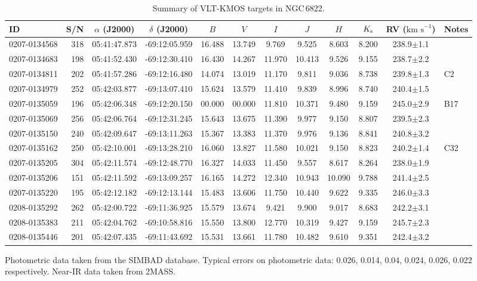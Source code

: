 \documentclass[useAMS,usenatbib]{mn2e}
\def\kms{$\mbox{km s}^{-1}$}
\begin{document}
\begin{table}
\caption{
        Summary of VLT-KMOS targets in NGC\,6822.\label{tb:obs-params}
        }
\scriptsize
\begin{center}
\begin{tabular}{lrcccccccccl}
 \hline
 \hline
ID & S/N & $\alpha$ (J2000) & $\delta$ (J2000) & $B$ & $V$ & $I$ & $J$ & $H$ & $K_{\rm s}$ & RV (\kms) & Notes \\
 \hline
0207-0134568 & 318 & 05:41:47.873 & -69:12:05.959 & 16.488 & 13.749 &  9.769 &  9.525 &  8.603 & 8.200 & 238.9$\pm$1.1\\
0207-0134683 & 198 & 05:41:52.430 & -69:12:30.410 & 16.430 & 14.267 & 11.970 & 10.413 &  9.526 & 9.155 & 238.7$\pm$2.2\\
0207-0134811 & 202 & 05:41:57.286 & -69:12:16.480 & 14.074 & 13.019 & 11.170 &  9.811 &  9.036 & 8.738 & 239.8$\pm$1.3 & C2\\
0207-0134979 & 252 & 05:42:03.877 & -69:13:07.410 & 15.624 & 13.579 & 11.410 &  9.839 &  8.996 & 8.740 & 240.4$\pm$1.5\\
0207-0135059 & 196 & 05:42:06.348 & -69:12:20.150 & 00.000 & 00.000 & 11.810 & 10.371 &  9.480 & 9.159 & 245.0$\pm$2.9 & B17\\
0207-0135069 & 256 & 05:42:06.764 & -69:12:31.245 & 15.643 & 13.675 & 11.390 &  9.977 &  9.150 & 8.807 & 239.5$\pm$2.3\\
0207-0135150 & 240 & 05:42:09.647 & -69:13:11.263 & 15.367 & 13.383 & 11.370 &  9.976 &  9.136 & 8.841 & 240.8$\pm$3.2\\
0207-0135162 & 250 & 05:42:10.001 & -69:13:28.210 & 16.060 & 13.827 & 11.580 & 10.021 &  9.150 & 8.823 & 240.2$\pm$1.4 & C32\\
0207-0135205 & 304 & 05:42:11.574 & -69:12:48.770 & 16.327 & 14.033 & 11.450 &  9.557 &  8.617 & 8.264 & 238.0$\pm$1.9\\
0207-0135206 & 151 & 05:42:11.592 & -69:13:09.257 & 16.165 & 14.272 & 12.340 & 10.943 & 10.090 & 9.788 & 241.4$\pm$2.5\\
0207-0135220 & 195 & 05:42:12.182 & -69:12:13.144 & 15.483 & 13.606 & 11.750 & 10.440 &  9.622 & 9.335 & 246.0$\pm$3.3\\
0208-0135292 & 262 & 05:42:00.722 & -69:11:36.925 & 15.579 & 13.674 &  9.421 &  9.900 &  9.017 & 8.683 & 242.2$\pm$3.1\\
0208-0135383 & 211 & 05:42:04.762 & -69:10:58.816 & 15.550 & 13.800 & 12.770 & 10.319 &  9.427 & 9.159 & 245.7$\pm$2.3\\
0208-0135446 & 201 & 05:42:07.435 & -69:11:43.692 & 15.531 & 13.661 & 11.780 & 10.482 &  9.610 & 9.351 & 242.4$\pm$3.2\\
\hline
\end{tabular}
\end{center}
{Photometric data taken from the SIMBAD database. Typical errors on photometric data:
0.026, 0.014, 0.04, 0.024, 0.026, 0.022 respectively.
Near-IR data taken from 2MASS.}
\end{table}
\end{document}

